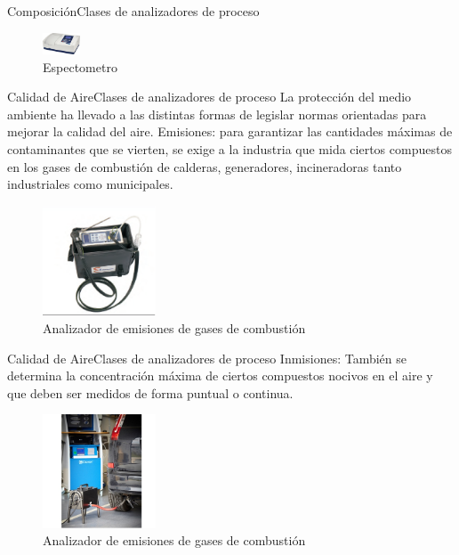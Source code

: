 \documentclass[10pt]{beamer}
\begin{document}
{\begin{frame}{Composición}{Clases de analizadores de proceso}
\begin{figure}
\end{figure}
\begin{figure}%
\includegraphics[width=0.1\textwidth]{figura_14.jpg} %
\caption{\label{fig:10}Espectometro} %
\end{figure}
\end{frame}  
\begin{frame}{Calidad de Aire}{Clases de analizadores de proceso}
La protección del medio ambiente ha llevado a las distintas formas de legislar normas orientadas para mejorar la calidad del aire.
\vskip 0.5cm
Emisiones: para garantizar las cantidades máximas de contaminantes que se vierten, se exige a la industria que mida ciertos compuestos en los gases de combustión de calderas, generadores, incineradoras tanto industriales como municipales.
\begin{figure}%
\includegraphics[width=0.3\textwidth]{figura_15.png} %
\caption{\label{fig:11}Analizador de emisiones de gases de combustión} %
\end{figure}
\end{frame} 
\begin{frame}{Calidad de Aire}{Clases de analizadores de proceso}
Inmisiones: También se determina la concentración máxima de ciertos compuestos nocivos en el aire y que deben ser medidos de forma puntual o continua.
\begin{figure}%
\includegraphics[width=0.3\textwidth]{figura_16.jpg} %
\caption{\label{fig:12}Analizador de emisiones de gases de combustión} %
\end{figure}
\end{frame}   
 
}
\end{document}
